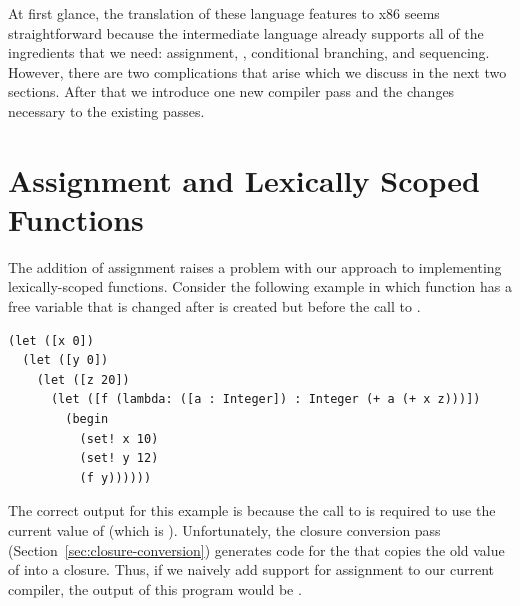 \documentclass[11pt]{book}
\begin{document}
  
At first glance, the translation of these language features to x86
seems straightforward because the \LangCFun{} intermediate language already
supports all of the ingredients that we need: assignment, ,
conditional branching, and sequencing. However, there are two
complications that arise which we discuss in the next two
sections. After that we introduce one new compiler pass and the
changes necessary to the existing passes.

\section{Assignment and Lexically Scoped Functions}
\label{sec:assignment-scoping}

The addition of assignment raises a problem with our approach to
implementing lexically-scoped functions. Consider the following
example in which function  has a free variable  that
is changed after  is created but before the call to .
\begin{lstlisting}
(let ([x 0])
  (let ([y 0])
    (let ([z 20])
      (let ([f (lambda: ([a : Integer]) : Integer (+ a (+ x z)))])
        (begin
          (set! x 10)
          (set! y 12)
          (f y))))))
\end{lstlisting}
The correct output for this example is  because the call to
 is required to use the current value of  (which is
). Unfortunately, the closure conversion pass
(Section~\ref{sec:closure-conversion}) generates code for the
 that copies the old value of  into a
closure. Thus, if we naively add support for assignment to our current
compiler, the output of this program would be .
\end{document}
